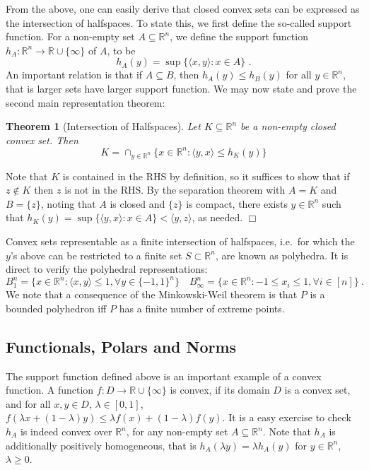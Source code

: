 \documentclass[11pt]{article}
\newtheorem{theorem}{Theorem}
\theoremstyle{plain}
\newenvironment{proof}{\noindent {\sc Proof:}}{$\Box$ \medskip}
\theoremstyle{plain}
\newcommand{\set}[1]{\{{#1}\}}
\newcommand{\R}{\ensuremath{\mathbb{R}}}
\newcommand{\pr}[2]{\langle{#1, #2}\rangle}
\begin{document}
From the above, one can easily derive that closed convex sets can be expressed
as the intersection of halfspaces. To state this, we first define the so-called
support function. For a non-empty set $A \subseteq \R^n$, we define the support
function $h_A: \R^n \rightarrow \R \cup \set{\infty}$ of $A$, to be
\begin{equation}
\label{def:supf}
h_A(y) = \sup \set{ \pr{x}{y}: x \in A} \text{ .}
\end{equation}
An important relation is that if $A \subseteq B$, then $h_A(y) \leq h_B(y)$ for
all $y \in \R^n$, that is larger sets have larger support function. We may now
state and prove the second main representation theorem:

\begin{theorem}[Intersection of Halfspaces] Let $K \subseteq \R^n$ be a
non-empty closed convex set. Then
\[
K = \cap_{y \in \R^n} \set{x \in \R^n: \pr{y}{x} \leq h_K(y)}
\]
\vspace{-2em}
\label{thm:half-int}
\end{theorem}
\begin{proof}
Note that $K$ is contained in the RHS by definition, so it suffices to show that
if $z \notin K$ then $z$ is not in the RHS. By the separation theorem with $A =
K$ and $B = \set{z}$, noting that $A$ is closed and $\set{z}$ is compact, there
exists $y \in \R^n$ such that $h_K(y) = \sup \set{\pr{y}{x}: x \in A} <
\pr{y}{z}$, as needed.  
\end{proof}

Convex sets representable as a finite intersection of halfspaces, i.e.~for which
the $y$'s above can be restricted to a finite set $S \subset \R^n$, are known as
polyhedra. It is direct to verify the polyhedral representations:
\[
B_1^n = \set{x \in \R^n: \pr{x}{y} \leq 1, \forall y \in \set{-1,1}^n} \quad
B_\infty^n = \set{x \in \R^n: -1 \leq x_i \leq 1, \forall i \in [n]}~.
\] 
We note that a consequence of the Minkowski-Weil theorem is that $P$ is a
bounded polyhedron iff $P$ has a finite number of extreme points.

\subsection{Functionals, Polars and Norms}
 
The support function defined above is an important example of a convex function.
A function $f: D \rightarrow \R \cup \set{\infty}$ is convex, if its domain $D$
is a convex set, and for all $x,y \in D$, $\lambda \in [0,1]$, $f(\lambda x +
(1-\lambda) y) \leq \lambda f(x) + (1-\lambda) f(y)$. It is a easy exercise to
check $h_A$ is indeed convex over $\R^n$, for any non-empty set $A \subseteq
\R^n$. Note that $h_A$ is additionally positively homogeneous, that is
$h_A(\lambda y) = \lambda h_A(y)$ for $y \in \R^n$, $\lambda \geq 0$. 
\end{document}
